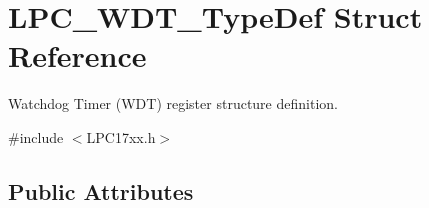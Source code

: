 \hypertarget{struct_l_p_c___w_d_t___type_def}{\section{\-L\-P\-C\-\_\-\-W\-D\-T\-\_\-\-Type\-Def \-Struct \-Reference}
\label{struct_l_p_c___w_d_t___type_def}
}


\-Watchdog \-Timer (\-W\-D\-T) register structure definition.  




{\ttfamily \#include $<$\-L\-P\-C17xx.\-h$>$}

\subsection*{\-Public \-Attributes}
